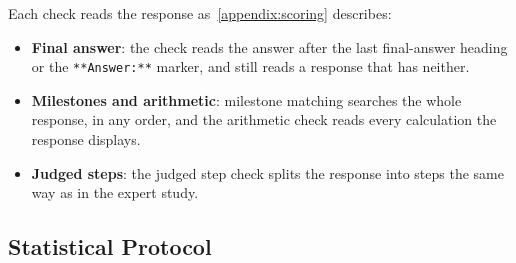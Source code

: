 Each check reads the response as~\autoref{appendix:scoring} describes:
\begin{itemize}
    \item \textbf{Final answer}: the check reads the answer after the last final-answer heading or
    the \texttt{**Answer:**} marker, and still reads a response that has neither.
    \item \textbf{Milestones and arithmetic}: milestone matching searches the whole response, in any
    order, and the arithmetic check reads every calculation the response displays.
    \item \textbf{Judged steps}: the judged step check splits the response into steps the same way
    as in the expert study.
\end{itemize}

\subsection{Statistical Protocol}
\label{appendix:protocol}

